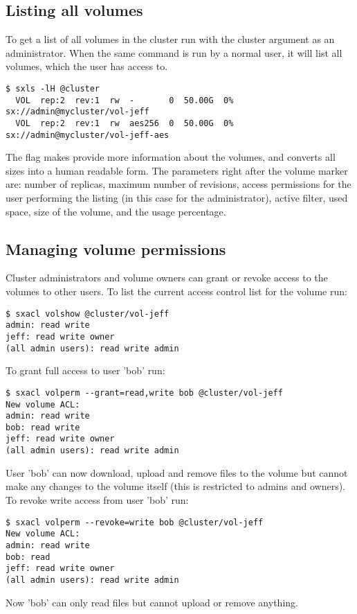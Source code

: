 \subsection{Listing all volumes}
To get a list of all volumes in the cluster run  with the cluster
argument as an administrator. When the same command is run by a normal user,
it will list all volumes, which the user has access to.
\begin{lstlisting}
$ sxls -lH @cluster
  VOL  rep:2  rev:1  rw  -       0  50.00G  0% sx://admin@mycluster/vol-jeff
  VOL  rep:2  rev:1  rw  aes256  0  50.00G  0% sx://admin@mycluster/vol-jeff-aes
\end{lstlisting}
The  flag makes  provide more information
about the volumes, and  converts all sizes into a human readable form.
The parameters right after the volume marker  are: number of replicas,
maximum number of revisions, access permissions for the user performing the
listing (in this case for the administrator), active filter, used space, size
of the volume, and the usage percentage.

\subsection{Managing volume permissions}
Cluster administrators and volume owners can grant or revoke access
to the volumes to other users. To list the current access control list
for the volume  run:
\begin{lstlisting}
$ sxacl volshow @cluster/vol-jeff
admin: read write
jeff: read write owner
(all admin users): read write admin
\end{lstlisting}
To grant full access to user 'bob' run:
\begin{lstlisting}
$ sxacl volperm --grant=read,write bob @cluster/vol-jeff
New volume ACL:
admin: read write
bob: read write
jeff: read write owner
(all admin users): read write admin
\end{lstlisting}
User 'bob' can now download, upload and remove files to the volume but cannot
make any changes to the volume itself (this is restricted to admins
and owners). To revoke write access from user 'bob' run:
\begin{lstlisting}
$ sxacl volperm --revoke=write bob @cluster/vol-jeff
New volume ACL:
admin: read write
bob: read
jeff: read write owner
(all admin users): read write admin
\end{lstlisting}
Now 'bob' can only read files but cannot upload or remove anything.


